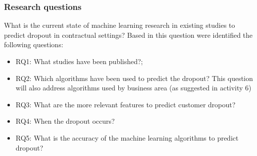 \documentclass[10pt]{beamer}
\begin{document}
\begin{frame}
	\frametitle{Research questions}
	What is the current state of machine learning research in existing studies to predict dropout in contractual settings? Based in this question were identified the following questions:
	\begin{itemize}
		\item RQ1: What studies have been published?;
		\item RQ2: Which algorithms have been used to predict the dropout? This question will also address algorithms used by business area (as suggested in activity 6)
		\item RQ3: What are the more relevant features to predict customer dropout?
		\item RQ4: When the dropout occurs? 
		\item RQ5: What is the accuracy of the machine learning algorithms to predict dropout?
	\end{itemize}
\end{frame}

\end{document}
